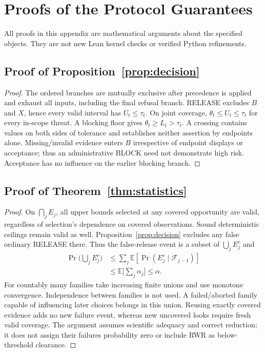 \section{Proofs of the Protocol Guarantees}
\label{app:proofs}
All proofs in this appendix are mathematical arguments about the specified
objects. They are not new Lean kernel checks or verified Python refinements.

\subsection{Proof of Proposition~\ref{prop:decision}}
\begin{proof}
The ordered branches are mutually exclusive after precedence is applied and
exhaust all inputs, including the final refusal branch. RELEASE excludes $B$
and $X$, hence every valid interval has $U_t\le\tau_t$.
On joint coverage, $\theta_t\le U_t\le\tau_t$ for every in-scope threat.
A blocking floor gives $\theta_t\ge L_t>\tau_t$. A crossing contains values
on both sides of tolerance and establishes neither assertion by endpoints
alone. Missing/invalid evidence enters $B$ irrespective of endpoint displays
or acceptance; thus an administrative BLOCK need not demonstrate high risk.
Acceptance has no influence on the earlier blocking branch.
\end{proof}

\subsection{Proof of Theorem~\ref{thm:statistics}}
\begin{proof}
On $\bigcap_j E_j$, all upper bounds selected at any covered opportunity are
valid, regardless of selection's dependence on covered observations.
Sound deterministic ceilings remain valid as well.
Proposition~\ref{prop:decision} excludes any false ordinary RELEASE there.
Thus the false-release event is a subset of $\bigcup_jE_j^c$ and
\[
\begin{aligned}
 \Pr\Big(\bigcup_jE_j^c\Big)
 &\le \sum_j\mathbb E[\Pr(E_j^c\mid\mathcal F_{j-1})]\\
 &\le \mathbb E\Big[\sum_j\alpha_j\Big]\le\alpha .
\end{aligned}
\]
For countably many families take increasing finite unions and use monotone
convergence. Independence between families is not used.
A failed/aborted family capable of influencing later choices belongs in this
union. Reusing exactly covered evidence adds no new failure event, whereas
new uncovered looks require fresh valid coverage. The argument assumes
scientific adequacy and correct reduction; it does not assign their failures
probability zero or include RWR as below-threshold clearance.
\end{proof}

